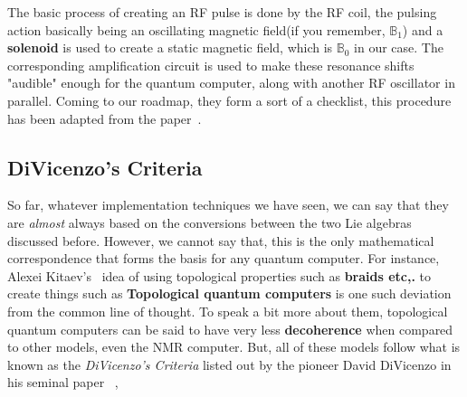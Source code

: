 \documentclass[12pt]{article}
\begin{document}
The basic process of creating an RF pulse is done by the RF coil, the pulsing action basically being an oscillating magnetic field(if you remember, $\mathbb{B}_1$) and a \textbf{solenoid} is used to create a static magnetic field, which is $\mathbb{B}_0$ in our case. The corresponding amplification circuit is used to make these resonance shifts "audible" enough for the quantum computer, along with another RF oscillator in parallel. Coming to our roadmap, they form a sort of a checklist, this procedure has been adapted from the paper~\cite{ethz}.
\clearpage
\subsection{DiVicenzo's Criteria}
So far, whatever implementation techniques we have seen, we can say that they are \textit{almost} always based on the conversions between the two Lie algebras discussed before. However, we cannot say that, this is the only mathematical correspondence that forms the basis for any quantum computer. For instance, Alexei Kitaev's ~\cite{kit}idea of using topological properties such as \textbf{braids etc,.} to create things such as \textbf{Topological quantum computers} is one such deviation from the common line of thought. To speak a bit more about them, topological quantum computers can be said to have very less \textbf{decoherence} when compared to other models, even the NMR computer. But, all of these models follow what is known as the \textit{DiVicenzo's Criteria} listed out by the pioneer David DiVicenzo in his seminal paper ~\cite{ddv1},
\end{document}
